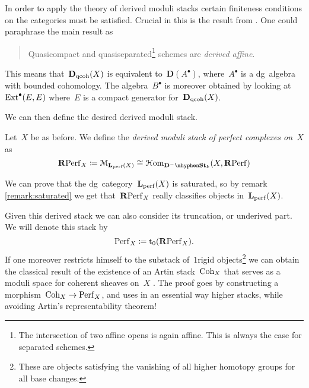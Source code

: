 \begin{refsection}
In order to apply the theory of derived moduli stacks certain finiteness conditions on the categories must be satisfied. Crucial in this is the result from \cite{bondal-vandenbergh}. One could paraphrase the main result as
\begin{quote}
  Quasicompact and quasiseparated\footnote{The intersection of two affine opens is again affine. This is always the case for separated schemes.} schemes are \emph{derived affine}.
\end{quote}
\begin{flushright}
  \cite[corollary 3.1.8]{bondal-vandenbergh}
\end{flushright}
This means that~$\mathbf{D}_{\mathrm{qcoh}}(X)$ is equivalent to~$\mathbf{D}(A^\bullet)$, where~$A^\bullet$ is a dg~algebra with bounded cohomology. The algebra~$B^\bullet$ is moreover obtained by looking at~$\mathrm{Ext}^\bullet(E,E)$ where~$E$ is a compact generator for~$\mathbf{D}_{\mathrm{qcoh}}(X)$.

We can then define the desired derived moduli stack.
\begin{definition}
  Let~$X$ be as before. We define the \emph{derived moduli stack of perfect complexes on~$X$} as
  \begin{equation}
    \RPerf_X\coloneqq\mathcal{M}_{\LLL_\perf(X)}\cong\HHom_{\mathbf{D}^-\mhyphen\St_k}(X,\RPerf)
  \end{equation}
\end{definition}

\begin{remark}
  We can prove that the dg~category~$\mathbf{L}_{\mathrm{perf}}(X)$ is saturated, so by remark \ref{remark:saturated} we get that~$\mathbf{R}\mathrm{Perf}_X$ really classifies objects in~$\mathbf{L}_{\mathrm{perf}}(X)$.
\end{remark}

\begin{remark}
  Given this derived stack we can also consider its truncation, or underived part. We will denote this stack by
  \begin{equation}
    \mathrm{Perf}_X\coloneqq\mathrm{t}_0(\mathbf{R}\mathrm{Perf}_X).
  \end{equation}
  If one moreover restricts himself to the substack of~$1$\dash rigid objects\footnote{These are objects satisfying the vanishing of all higher homotopy groups for all base changes.} we can obtain the classical result of the existence of an Artin stack~$\mathrm{Coh}_X$ that serves as a moduli space for coherent sheaves on~$X$ \cite[th\'eor\`eme 4.6.2.1]{laumon-moret-bailly} \cite[tag 08KA]{stacks}. The proof goes by constructing a morphism~$\mathrm{Coh}_X\to\mathrm{Perf}_X$, and uses in an essential way higher stacks, while avoiding Artin's representability theorem!
\end{remark}



\printbibliography[heading = local]

\end{refsection}
